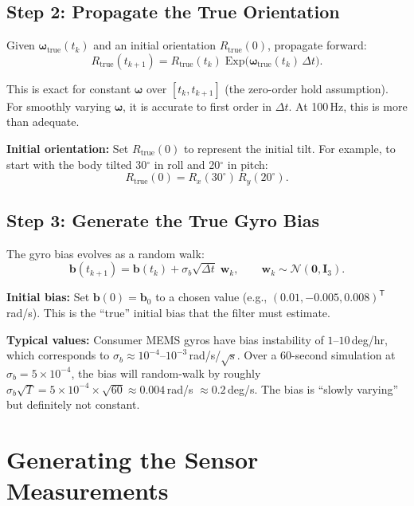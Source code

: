 \documentclass[11pt,letterpaper]{article}
\newcommand{\expmap}{\mathrm{Exp}}
\newcommand{\eye}{\mathbf{I}}
\begin{document}
\subsection{Step 2: Propagate the True Orientation}

Given $\bm{\omega}_{\mathrm{true}}(t_k)$ and an initial orientation
$R_{\mathrm{true}}(0)$, propagate forward:
\[
  \boxed{
  R_{\mathrm{true}}(t_{k+1})
  = R_{\mathrm{true}}(t_k) \; \expmap\bigl(\bm{\omega}_{\mathrm{true}}(t_k)
    \, \Delta t\bigr).
  }
\]

This is exact for constant $\bm{\omega}$ over $[t_k, t_{k+1}]$
(the zero-order hold assumption).  For smoothly varying
$\bm{\omega}$, it is accurate to first order in $\Delta t$.  At
100\,Hz, this is more than adequate.

\textbf{Initial orientation:}  Set $R_{\mathrm{true}}(0)$ to
represent the initial tilt.  For example, to start with the body
tilted 30$^{\circ}$ in roll and 20$^{\circ}$ in pitch:
\[
  R_{\mathrm{true}}(0) = R_x(30^{\circ})\, R_y(20^{\circ}).
\]

\subsection{Step 3: Generate the True Gyro Bias}

The gyro bias evolves as a random walk:
\[
  \boxed{
  \mathbf{b}(t_{k+1}) = \mathbf{b}(t_k)
    + \sigma_b \sqrt{\Delta t} \;\mathbf{w}_k,
  \qquad \mathbf{w}_k \sim \mathcal{N}(\mathbf{0}, \eye_3).
  }
\]

\textbf{Initial bias:}  Set $\mathbf{b}(0) = \mathbf{b}_0$ to a
chosen value (e.g., $(0.01, -0.005, 0.008)^{\mathsf{T}}$ rad/s).
This is the ``true'' initial bias that the filter must estimate.

\textbf{Typical values:}  Consumer MEMS gyros have bias instability
of $1$--$10$\,deg/hr, which corresponds to
$\sigma_b \approx 10^{-4}$--$10^{-3}$\,rad/s/$\sqrt{\text{s}}$.
Over a 60-second simulation at $\sigma_b = 5 \times 10^{-4}$, the
bias will random-walk by roughly
$\sigma_b \sqrt{T} = 5 \times 10^{-4} \times \sqrt{60}
\approx 0.004$\,rad/s $\approx 0.2$\,deg/s.  The bias is
``slowly varying'' but definitely not constant.

\section{Generating the Sensor Measurements}
\end{document}
